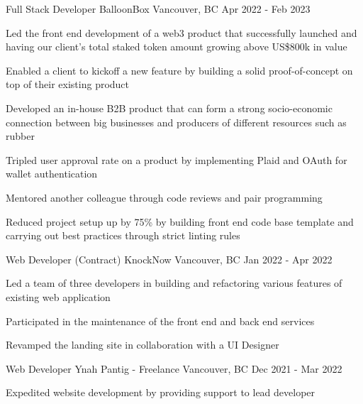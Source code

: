 
\begin{cventries}
  \cventry
    {Full Stack Developer} %
    {BalloonBox} %
    {Vancouver, BC} %
    {Apr 2022 - Feb 2023} %
    {
      \begin{cvitems} %
        \item{Led the front end development of a web3 product that successfully launched and having our client's total staked token amount growing above US\$800k in value}
        \item{Enabled a client to kickoff a new feature by building a solid proof-of-concept on top of their existing product}
        \item{Developed an in-house B2B product that can form a strong socio-economic connection between big businesses and producers of different resources such as rubber}
        \item{Tripled user approval rate on a product by implementing Plaid and OAuth for wallet authentication}
        \item{Mentored another colleague through code reviews and pair programming}
        \item{Reduced project setup up by 75\% by building front end code base template and carrying out best practices through strict linting rules}
      \end{cvitems}
    }

  \cventry
    {Web Developer (Contract)} %
    {KnockNow} %
    {Vancouver, BC} %
    {Jan 2022 - Apr 2022} %
    {
      \begin{cvitems} %
        \item{Led a team of three developers in building and refactoring various features of existing web application}
        \item{Participated in the maintenance of the front end and back end services}
        \item{Revamped the landing site in collaboration with a UI Designer}
      \end{cvitems}
    }

  \cventry
    {Web Developer} %
    {Ynah Pantig - Freelance} %
    {Vancouver, BC} %
    {Dec 2021 - Mar 2022} %
    {
      \begin{cvitems} %
        \item {Expedited website development by providing support to lead developer}
      \end{cvitems}
    }


\end{cventries}
